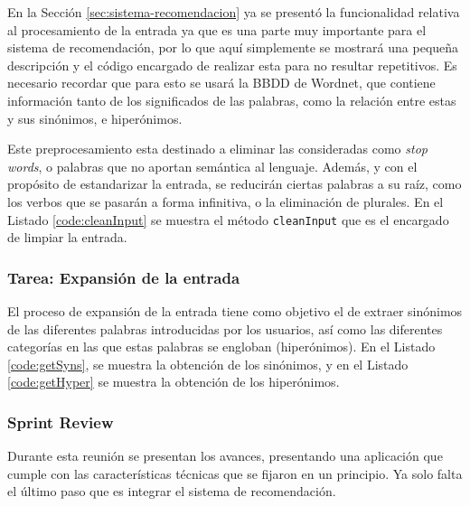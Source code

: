 En la Sección \ref{sec:sistema-recomendacion} ya se presentó la funcionalidad relativa al procesamiento de la entrada ya que es una parte muy importante para el sistema de recomendación, por lo que aquí simplemente se mostrará una pequeña descripción y el código encargado de realizar esta para no resultar repetitivos. Es necesario recordar que para esto se usará la \ac{BBDD} de Wordnet, que contiene información tanto de los significados de las palabras, como la relación entre estas  y sus sinónimos, e hiperónimos.

Este preprocesamiento esta destinado a eliminar las consideradas como \textit{stop words}, o palabras que no aportan semántica al lenguaje. Además, y con el propósito de estandarizar la entrada, se reducirán ciertas palabras a su raíz, como los verbos que se pasarán a forma infinitiva, o la eliminación de plurales. En el Listado \ref{code:cleanInput} se muestra el método \texttt{cleanInput} que es el encargado de limpiar la entrada.\\



\subsubsection{Tarea: Expansión de la entrada}

El proceso de expansión de la entrada tiene como objetivo el de extraer sinónimos de las diferentes palabras introducidas por los usuarios, así como las diferentes categorías en las que estas palabras se engloban (hiperónimos). En el Listado \ref{code:getSyns}, se muestra la obtención de los sinónimos, y en el Listado \ref{code:getHyper} se muestra la obtención de los hiperónimos.\\





\subsubsection{Sprint Review}

Durante esta reunión se presentan los avances, presentando una aplicación que cumple con las características técnicas que se fijaron en un principio. Ya solo falta el último paso que es integrar el sistema de recomendación.

